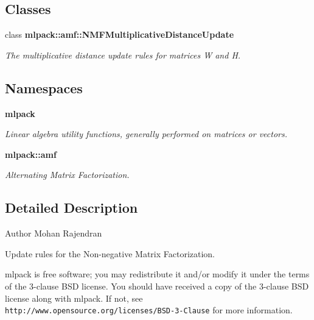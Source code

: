 \subsection*{Classes}
\begin{DoxyCompactItemize}
\item 
class {\bf mlpack\+::amf\+::\+N\+M\+F\+Multiplicative\+Distance\+Update}
\begin{DoxyCompactList}\small\item\em The multiplicative distance update rules for matrices W and H. \end{DoxyCompactList}\end{DoxyCompactItemize}
\subsection*{Namespaces}
\begin{DoxyCompactItemize}
\item 
 {\bf mlpack}
\begin{DoxyCompactList}\small\item\em Linear algebra utility functions, generally performed on matrices or vectors. \end{DoxyCompactList}\item 
 {\bf mlpack\+::amf}
\begin{DoxyCompactList}\small\item\em Alternating Matrix Factorization. \end{DoxyCompactList}\end{DoxyCompactItemize}


\subsection{Detailed Description}
\begin{DoxyAuthor}{Author}
Mohan Rajendran
\end{DoxyAuthor}
Update rules for the Non-\/negative Matrix Factorization.

mlpack is free software; you may redistribute it and/or modify it under the terms of the 3-\/clause B\+SD license. You should have received a copy of the 3-\/clause B\+SD license along with mlpack. If not, see {\tt http\+://www.\+opensource.\+org/licenses/\+B\+S\+D-\/3-\/\+Clause} for more information. 
